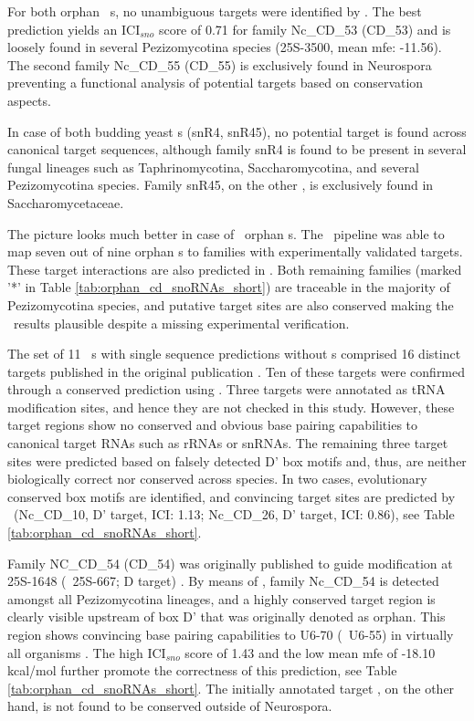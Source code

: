For both orphan \ncr\ \sno s, no unambiguous targets were identified by
\snostrip. The best prediction yields an ICI$_{sno}$ score of 0.71 for
family Nc\_CD\_53 (CD\_53) and is loosely found in several
Pezizomycotina species (25S-3500, mean mfe: -11.56). The second family
Nc\_CD\_55 (CD\_55) is exclusively found in Neurospora preventing a
functional analysis of potential targets based on conservation
aspects.

In case of both budding yeast \sno s (snR4, snR45), no potential target is
found across canonical target sequences, although family snR4 is found to
be present in several fungal lineages such as Taphrinomycotina,
Saccharomycotina, and several Pezizomycotina species. Family snR45, on the
other , is exclusively found in Saccharomycetaceae.

The picture looks much better in case of \afu\ orphan \sno s. The
\snostrip\ pipeline was able to map seven out of nine orphan \cd s to
families with experimentally validated targets. These target interactions
are also predicted in \afu. Both remaining families (marked  '*' in
Table \ref{tab:orphan_cd_snoRNAs_short}) are traceable in the majority of
Pezizomycotina species, and putative target sites are also conserved making
the \snostrip\ results plausible despite a missing experimental
verification.

The set of 11 \ncr\ \sno s with single sequence predictions without
 \sno s comprised 16 distinct targets
published in the original publication \cite{Li:2005}.  Ten of these targets
were confirmed through a conserved prediction using \snostrip.  Three
targets were annotated as tRNA modification sites, and hence they are not
checked in this study. However, these target regions show no conserved and
obvious base pairing capabilities to canonical target RNAs such as rRNAs or
snRNAs. The remaining three target sites were predicted based on falsely
detected D' box motifs and, thus, are neither biologically correct nor
conserved across species. In two cases, evolutionary conserved box motifs
are identified, and convincing target sites are predicted by \snostrip\
(Nc\_CD\_10, D' target, ICI: 1.13; Nc\_CD\_26, D' target, ICI: 0.86), see
Table \ref{tab:orphan_cd_snoRNAs_short}.

Family NC\_CD\_54 (CD\_54) was originally published to guide modification
at 25S-1648 (\ncr\ 25S-667; D target) \cite{Liu:2009}. By means of
\snostrip, family Nc\_CD\_54 is detected amongst all Pezizomycotina
lineages, and a highly conserved target region is clearly visible upstream
of box D' that was originally denoted as orphan. This region shows
convincing base pairing capabilities to U6-70 (\ncr\ U6-55) in virtually
all organisms \PFS{considered here}. The high ICI$_{sno}$ score of 1.43 and
the low mean mfe of -18.10 kcal/mol further promote the correctness of this
prediction, see Table \ref{tab:orphan_cd_snoRNAs_short}. The initially
annotated target \PFS{for box D}, on the other hand, is not found to be
conserved outside of Neurospora.

